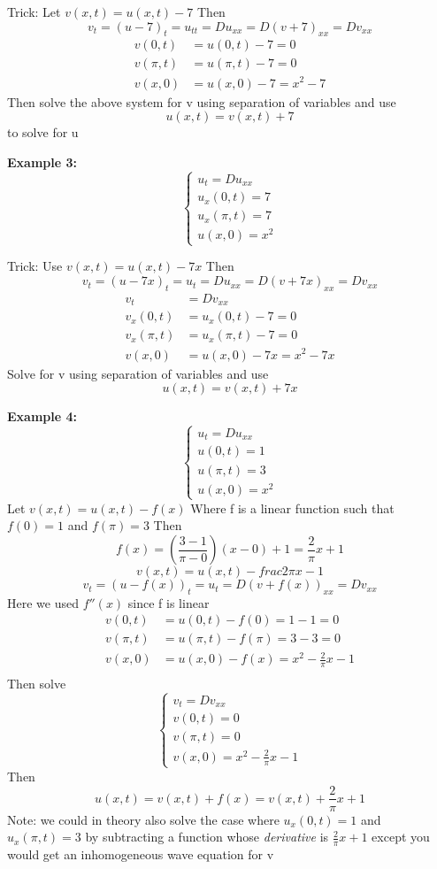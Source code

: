 \documentclass[12pt]{article}
\begin{document}
Trick: Let $v(x, t) = u(x, t) - 7$
Then 
\[v_t = (u - 7)_t = u_{tt} = Du_{xx} = D(v + 7)_{xx} = Dv_{xx}\]
\begin{align*}
    v(0, t) &= u(0, t) - 7 = 0\\
    v(\pi, t) &= u(\pi, t) - 7 = 0\\
    v(x, 0) &= u(x, 0) - 7= x^2 - 7
\end{align*}
Then solve the above system for v using separation of variables and use 
\[u(x, t) = v(x, t) + 7\]
to solve for u

\textbf{Example 3:}
\[\begin{cases}
    u_t = Du_{xx}\\
    u_x(0, t) = 7\\
    u_x(\pi, t) = 7\\
    u(x, 0) = x^2
\end{cases}\]

Trick: Use $v(x, t) = u(x, t) - 7x$
Then 
\[v_t = (u - 7x)_t = u_t = Du_{xx} = D(v + 7x)_{xx} = Dv_{xx}\]
\begin{align*}
    v_t &= Dv_{xx}\\
    v_x(0, t) &= u_x(0, t) - 7 = 0\\
    v_x(\pi, t) &= u_x(\pi, t) - 7 = 0\\
    v(x, 0) &= u(x, 0) - 7x = x^2 - 7x
\end{align*}
Solve for v using separation of variables and use 
\[u(x, t) = v(x, t) + 7x\]

\textbf{Example 4:}
\[\begin{cases}
    u_t = Du_{xx}\\
    u(0, t) = 1\\
    u(\pi, t) = 3\\
    u(x, 0) = x^2
\end{cases}\]
Let $v(x, t) = u(x, t) - f(x)$
Where f is a linear function such that $f(0) = 1$ and $f(\pi) = 3$
Then 
\[f(x) = \left(\frac{3 - 1}{\pi - 0}\right)(x -0) + 1 = \frac{2}{\pi}x + 1\]
\[v(x, t) = u(x, t) - frac{2}{\pi}x - 1\]
\[v_t = (u - f(x))_t = u_t = D(v + f(x))_{xx} = Dv_{xx}\]
Here we used $f''(x)$ since f is linear 
\begin{align*}
    v(0, t) &= u(0, t) - f(0) = 1 - 1=0\\
    v(\pi, t) &= u(\pi, t) - f(\pi) = 3 - 3=0\\
    v(x, 0) &= u(x, 0) - f(x) = x^2 - \frac{2}{\pi}x- 1\\
\end{align*}
Then solve 
\[\begin{cases}
    v_t = Dv_{xx}\\
    v(0, t) = 0\\
    v(\pi, t) = 0\\
    v(x, 0) = x^2 - \frac{2}{\pi}x - 1
\end{cases}\]
Then 
\[u(x, t) = v(x, t) + f(x) = v(x, t) + \frac{2}{\pi}x + 1\]
Note: we could in theory also solve the case where $u_x(0, t) = 1$ and $u_x(\pi, t) = 3$ by subtracting a function whose \emph{derivative} is $\frac{2}{\pi}x + 1$ except you would get an inhomogeneous wave equation for v
\end{document}
